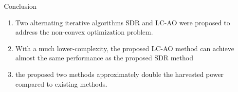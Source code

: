 \documentclass{beamer}
\begin{document}
\begin{frame}{Conclusion}
    \begin{enumerate}
        \item Two alternating iterative algorithms
SDR and LC-AO were proposed to address the non-convex
optimization problem.
\item With a much lower-complexity, the proposed LC-AO method can achieve almost the same
performance as the proposed SDR method
\item the proposed two methods approximately double the harvested power compared to existing methods.
    \end{enumerate}
\end{frame}
\end{document}
